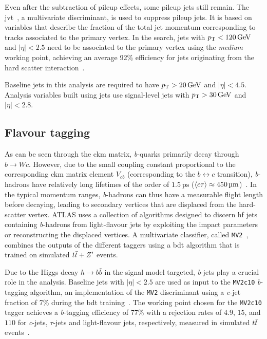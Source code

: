 Even after the subtraction of pileup effects, some pileup jets still remain. The \gls{jvt}~\cite{PERF-2014-03}, a multivariate discriminant, is used to suppress pileup jets. It is based on variables that describe the fraction of the total jet momentum corresponding to tracks associated to the primary vertex. In the \onelepton search, jets with $\pt < \SI{120}{\GeV}$ and $\vert\eta\vert < 2.5$ need to be associated to the primary vertex using the \textit{medium} working point, achieving an average 92\% efficiency for jets originating from the hard scatter interaction~\cite{Aad:2020flx}.

Baseline jets in this analysis are required to have $\pt > \SI{20}{\GeV}$ and $\vert\eta\vert < 4.5$. Analysis variables built using jets use signal-level jets with $\pt > \SI{30}{\GeV}$ and $\vert\eta\vert < 2.8$.

\subsection{Flavour tagging}\label{sec:flavour_tagging}

As can be seen through the \gls{ckm} matrix, \textit{b}-quarks primarily decay through $b\rightarrow W c$. However, due to the small coupling constant proportional to the corresponding \gls{ckm} matrix element $V_{cb}$ (corresponding to the $b \leftrightarrow c $ transition), \textit{b}-hadrons have relatively long lifetimes of the order of $\SI{1.5}{\pico\second}$ ($\braket{c\tau} \approx \SI{450}{\micro\meter}$)~\cite{pdg2020}. In the typical momentum ranges, \textit{b}-hadrons can thus have a measurable flight length before decaying, leading to secondary vertices that are displaced from the hard-scatter vertex. ATLAS uses a collection of algorithms designed to discern \gls{hf} jets containing \textit{b}-hadrons from light-flavour jets by exploiting the impact parameters or reconstructing the displaced vertices. A multivariate classifier, called \texttt{MV2}~\cite{ATL-PHYS-PUB-2017-013}, combines the outputs of the different taggers using a \gls{bdt} algorithm that is trained on simulated $t\bar{t} + Z'$ events. 

Due to the Higgs decay $h\rightarrow b\bar{b}$ in the signal model targeted, \textit{b}-jets play a crucial role in the analysis. Baseline jets with $\vert\eta\vert < 2.5$ are used as input to the \texttt{MV2c10} \textit{b}-tagging algorithm, an implementation of the \texttt{MV2} discriminant using a \textit{c}-jet fraction of 7\% during the \gls{bdt} training~\cite{FTAG-2018-01, PERF-2016-05}. The working point chosen for the \texttt{MV2c10} tagger achieves a \textit{b}-tagging efficiency of 77\% with a rejection rates of $4.9$, $15$, and $110$ for \textit{c}-jets, $\tau$-jets and light-flavour jets, respectively, measured in simulated $t\bar{t}$ events~\cite{FTAG-2018-01}.

